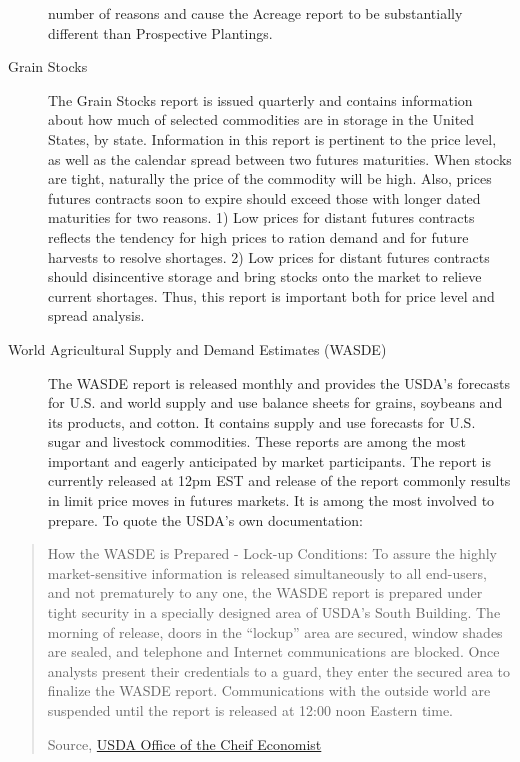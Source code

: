 \documentclass[
  letterpaper,
  DIV=11,
  numbers=noendperiod]{scrreprt}
\begin{document}
\begin{description}
number of reasons and cause the Acreage report to be substantially
different than Prospective Plantings.
\item[Grain Stocks]
The Grain Stocks report is issued quarterly and contains information
about how much of selected commodities are in storage in the United
States, by state. Information in this report is pertinent to the price
level, as well as the calendar spread between two futures maturities.
When stocks are tight, naturally the price of the commodity will be
high. Also, prices futures contracts soon to expire should exceed those
with longer dated maturities for two reasons. 1) Low prices for distant
futures contracts reflects the tendency for high prices to ration demand
and for future harvests to resolve shortages. 2) Low prices for distant
futures contracts should disincentive storage and bring stocks onto the
market to relieve current shortages. Thus, this report is important both
for price level and spread analysis.
\item[World Agricultural Supply and Demand Estimates (WASDE)]
The WASDE report is released monthly and provides the USDA's forecasts
for U.S. and world supply and use balance sheets for grains, soybeans
and its products, and cotton. It contains supply and use forecasts for
U.S. sugar and livestock commodities. These reports are among the most
important and eagerly anticipated by market participants. The report is
currently released at 12pm EST and release of the report commonly
results in limit price moves in futures markets. It is among the most
involved to prepare. To quote the USDA's own documentation:
\end{description}

\begin{quote}
How the WASDE is Prepared - Lock-up Conditions: To assure the highly
market-sensitive information is released simultaneously to all
end-users, and not prematurely to any one, the WASDE report is prepared
under tight security in a specially designed area of USDA's South
Building. The morning of release, doors in the ``lockup'' area are
secured, window shades are sealed, and telephone and Internet
communications are blocked. Once analysts present their credentials to a
guard, they enter the secured area to finalize the WASDE report.
Communications with the outside world are suspended until the report is
released at 12:00 noon Eastern time.

Source, \href{http://www.usda.gov/oce/commodity/wasde/prepared.htm}{USDA
Office of the Cheif Economist}
\end{quote}
\end{document}
